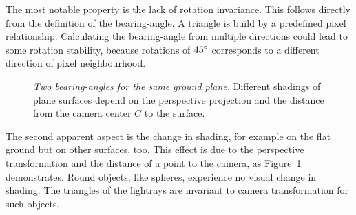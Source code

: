 The most notable property is the lack of rotation invariance.
This follows directly from the definition of the \gls{bearing-angle}.
A triangle is build by a predefined pixel relationship.
Calculating the \gls{bearing-angle} from multiple directions could lead to some rotation stability, because rotations of $45\degree$ corresponds to a different direction of pixel neighbourhood.
\begin{figure}[tb]
    \centering
    \caption[Two \glspl{bearing-angle} for the same ground plane]{\emph{Two \glspl{bearing-angle} for the same ground plane.} Different shadings of plane surfaces depend on the perspective projection and the distance from the camera center $C$ to the surface.}\label{fig:bearing_angle_shading}
\end{figure}
The second apparent aspect is the change in shading, for example on the flat ground but on other surfaces, too.
This effect is due to the perspective transformation and the distance of a point to the camera, as Figure~\ref{fig:bearing_angle_shading} demonstrates.
Round objects, like spheres, experience no visual change in shading.
The triangles of the lightrays are invariant to camera transformation for such objects.
